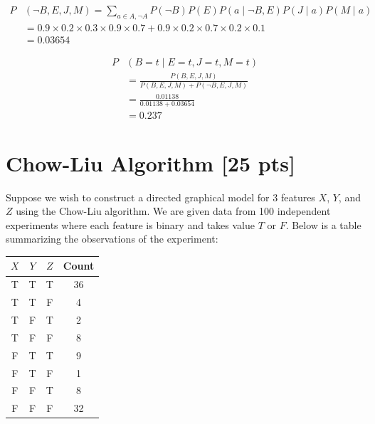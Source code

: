 \documentclass[a4paper]{article}
\theoremstyle{definition}
\newenvironment{soln}{
	\leavevmode\color{blue}\ignorespaces
}{}
\begin{document}
\begin{soln}
\begin{align*}
P&(\neg B,E,J,M) = \sum_{a \in A, \neg A} P(\neg B) P(E) P(a \mid \neg B, E) P(J \mid a) P(M \mid a)\\
&= 0.9 \times 0.2 \times 0.3 \times 0.9 \times 0.7 + 0.9 \times 0.2 \times 0.7 \times 0.2 \times 0.1 \\
&= 0.03654
\end{align*}

\begin{align*}
	P&(B=t \mid E=t, J=t, M=t) \\
	&= \frac{P(B,E,J,M)}{P(B,E,J,M) + P(\neg B,E,J,M)} \\
	&= \frac{0.01138}{0.01138 + 0.03654} \\&= 0.237
\end{align*}

\end{soln}


\section{Chow-Liu Algorithm [25 pts]}
Suppose we wish to construct a directed graphical model for 3 features $X$, $Y$, and $Z$ using the Chow-Liu algorithm. We are given data from 100 independent experiments where each feature is binary and takes value $T$ or $F$. Below is a table summarizing the observations of the experiment:

\begin{table}[H]
        \centering
                \begin{tabular}{cccc}
                           $X$ & $Y$ & $Z$ & Count \\
                                \hline
                                T & T & T & 36 \\
                                \hline
                                T & T & F & 4 \\
                                \hline
                                T & F & T & 2 \\
                                \hline
                                T & F & F & 8 \\
                                \hline
                                F & T & T & 9 \\
                                \hline
                                F & T & F & 1 \\
                                \hline
                                F & F & T & 8 \\
                                \hline
                                F & F & F & 32 \\
                                \hline
                \end{tabular}
\end{table}
\end{document}
